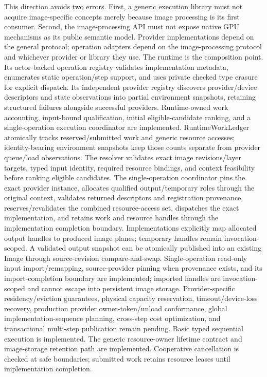 \documentclass[11pt,a4paper,oneside]{article}
\begin{document}
This direction avoids two errors. First, a generic execution library must not acquire image-specific concepts merely because image processing is its first consumer. Second, the image-processing API must not expose native GPU mechanisms as its public semantic model. Provider implementations depend on the general protocol; operation adapters depend on the image-processing protocol and whichever provider or library they use. The runtime is the composition point. Its actor-backed operation registry validates implementation metadata, enumerates static operation/step support, and uses private checked type erasure for explicit dispatch. Its independent provider registry discovers provider/device descriptors and state observations into partial environment snapshots, retaining structured failures alongside successful providers. Runtime-owned work accounting, input-bound qualification, initial eligible-candidate ranking, and a single-operation execution coordinator are implemented. RuntimeWorkLedger atomically tracks reserved/submitted work and generic resource accesses; identity-bearing environment snapshots keep those counts separate from provider queue/load observations. The resolver validates exact image revisions/layer targets, typed input identity, required resource bindings, and context feasibility before ranking eligible candidates. The single-operation coordinator pins the exact provider instance, allocates qualified output/temporary roles through the original context, validates returned descriptors and registration provenance, reserves/revalidates the combined resource-access set, dispatches the exact implementation, and retains work and resource handles through the implementation completion boundary. Implementations explicitly map allocated output handles to produced image planes; temporary handles remain invocation-scoped. A validated output snapshot can be atomically published into an existing Image through source-revision compare-and-swap. Single-operation read-only input import/remapping, source-provider pinning when provenance exists, and its import-completion boundary are implemented; imported handles are invocation-scoped and cannot escape into persistent image storage. Provider-specific residency/eviction guarantees, physical capacity reservation, timeout/device-loss recovery, production provider owner-token/unload conformance, global implementation-sequence planning, cross-step cost optimization, and transactional multi-step publication remain pending. Basic typed sequential execution is implemented. The generic resource-owner lifetime contract and image-storage retention path are implemented. Cooperative cancellation is checked at safe boundaries; submitted work retains resource leases until implementation completion.
\end{document}
